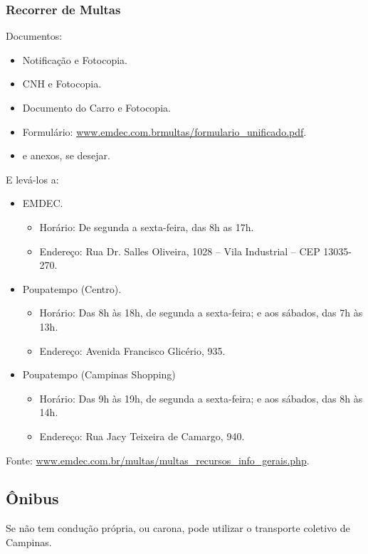 \subsubsection{Recorrer de Multas}

Documentos:
\begin{itemize}
\item  Notificação e Fotocopia.
\item  CNH e Fotocopia.
\item  Documento do Carro e Fotocopia.
\item  Formulário: \url{www.emdec.com.brmultas/formulario_unificado.pdf}.
\item  e anexos, se desejar.
\end{itemize}

E levá-los a:
\begin{itemize}
\item  EMDEC.
    \begin{itemize}
        \item  Horário: De segunda a sexta-feira, das 8h as 17h.
        \item  Endereço: Rua Dr. Salles Oliveira, 1028 -- Vila Industrial -- CEP 13035-270.
    \end{itemize}
\item  Poupatempo (Centro).
    \begin{itemize}
        \item  Horário: Das 8h às 18h, de segunda a sexta-feira; e aos sábados, das 7h às 13h.
        \item  Endereço: Avenida Francisco Glicério, 935.
    \end{itemize}
\item  Poupatempo (Campinas Shopping)
    \begin{itemize}
        \item  Horário: Das 9h às 19h, de segunda a sexta-feira; e aos sábados, das 8h às 14h.
        \item  Endereço: Rua Jacy Teixeira de Camargo, 940.
    \end{itemize}
\end{itemize}

Fonte: \url{www.emdec.com.br/multas/multas_recursos_info_gerais.php}.

\subsection{Ônibus}

Se não tem condução própria, ou carona, pode utilizar o transporte coletivo de
Campinas.

